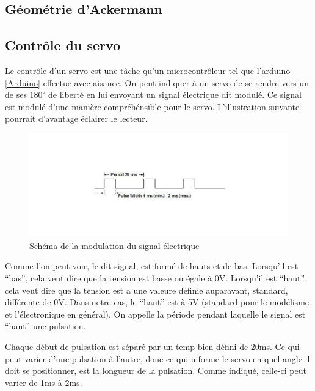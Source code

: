 \documentclass[a4paper,12pt]{report}
\begin{document}
{\subsection{Géométrie d'Ackermann}

\subsection{Contrôle du servo}
Le contr\^ole d'un servo est une tâche qu'un microcontr\^oleur tel que
l'arduino \ref{Arduino} effectue avec aisance. On peut indiquer \`a un servo de se rendre vers
un de ses $180^{\circ}$ de libert\'e en lui envoyant un signal \'electrique dit
modul\'e. Ce signal est modul\'e d'une mani\`ere compréh\'ensible pour le
servo. L'illustration suivante
pourrait d'avantage \'eclairer le lecteur.

\begin{figure}[h]
\centering
\includegraphics[width=1.0\textwidth]{figures/ServoPwm}
    \caption{\label{ServoPwm}Sch\'ema de la modulation du signal
      \'electrique \protect
      \cite{WikiServo}
    }
\end{figure}

Comme l'on peut voir, le dit signal, est form\'e de hauts et de
bas. Lorsqu'il est ``bas'', cela veut dire que la tension est basse ou \'egale
\`a 0V. Lorsqu'il est
``haut'', cela veut dire que la tension est a une valeure d\'efinie auparavant,
standard, diff\'erente de 0V. Dans notre cas, le ``haut'' est \`a 5V (standard
pour le mod\'elisme et l'\'electronique en g\'en\'eral). On appelle la
p\'eriode pendant laquelle le signal est ``haut'' une pulsation.

Chaque d\'ebut de pulsation est s\'epar\'e par un temp bien d\'efini de
20ms. Ce qui peut varier d'une pulsation \`a l'autre, donc ce qui informe le
servo en quel angle il doit se positionner, est la longueur de la
pulsation. Comme indiqu\'e, celle-ci peut varier de 1ms \`a 2ms.

}
\end{document}
